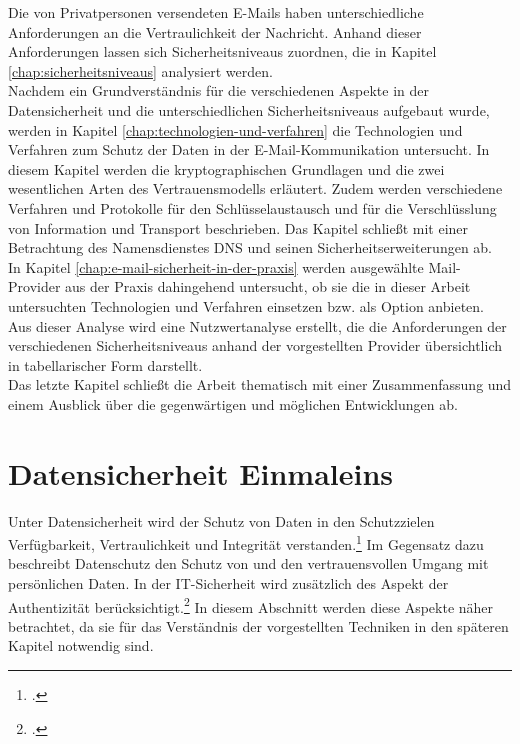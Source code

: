 \documentclass  [paper=a4,
				fontsize=12pt,
				listof=totoc,
				bibliography=totoc
				]{scrreprt}
\begin{document}
		Die von Privatpersonen versendeten E-Mails haben unterschiedliche Anforderungen an die Vertraulichkeit der Nachricht. 
		Anhand dieser Anforderungen lassen sich Sicherheitsniveaus zuordnen, die in Kapitel \ref{chap:sicherheitsniveaus} analysiert werden.\medskip\\		
		Nachdem ein Grundverständnis für die verschiedenen Aspekte in der Datensicherheit und die unterschiedlichen Sicherheitsniveaus aufgebaut wurde, werden in Kapitel \ref{chap:technologien-und-verfahren} die Technologien und Verfahren zum Schutz der Daten in der E-Mail-Kommunikation untersucht. 
		In diesem Kapitel werden die kryptographischen Grundlagen und die zwei wesentlichen Arten des Vertrauensmodells erläutert. Zudem werden verschiedene Verfahren und Protokolle für den Schlüsselaustausch und für die Verschlüsslung von Information und Transport beschrieben. 
		Das Kapitel schließt mit einer Betrachtung des Namensdienstes \ac{DNS} und seinen Sicherheitserweiterungen ab.\medskip\\		
		In Kapitel \ref{chap:e-mail-sicherheit-in-der-praxis} werden ausgewählte Mail-Provider aus der Praxis dahingehend untersucht, ob sie die in dieser Arbeit untersuchten Technologien und Verfahren einsetzen bzw. als Option anbieten. 
		Aus dieser Analyse wird eine Nutzwertanalyse erstellt, die die Anforderungen der verschiedenen Sicherheitsniveaus anhand der vorgestellten Provider übersichtlich in tabellarischer Form darstellt.\\
		Das letzte Kapitel schließt die Arbeit thematisch mit einer Zusammenfassung und einem Ausblick über die gegenwärtigen und möglichen Entwicklungen ab.
		
		

	\chapter{Datensicherheit Einmaleins}\label{sec:datensicherheit-einmaleins}
	Unter Datensicherheit wird der Schutz von Daten in den Schutzzielen Verfügbarkeit, Vertraulichkeit und Integrität verstanden.\footcite[Vgl.][]{BSI2014} Im Gegensatz dazu beschreibt Datenschutz den Schutz von und den vertrauensvollen Umgang mit persönlichen Daten. In der IT-Sicherheit wird zusätzlich des Aspekt der Authentizität berücksichtigt.\footcite[Vgl.][]{Berliner2014} In diesem Abschnitt werden diese Aspekte näher betrachtet, da sie für das Verständnis der vorgestellten Techniken in den späteren Kapitel notwendig sind.
	
\end{document}
